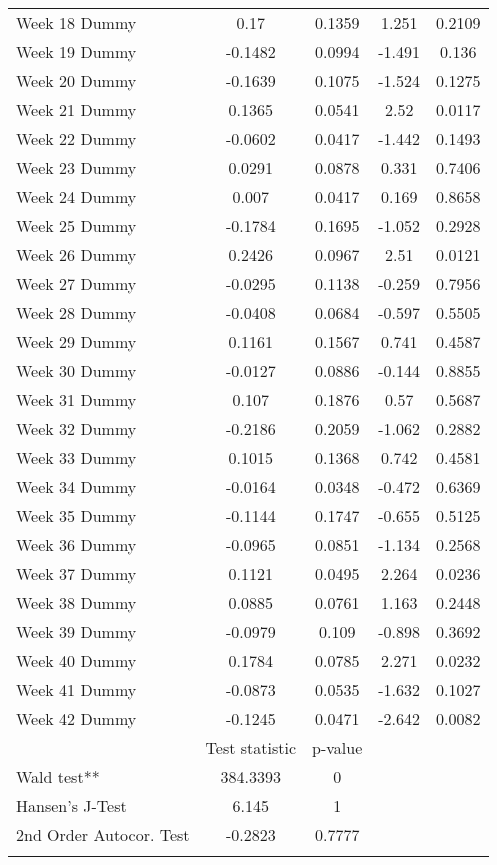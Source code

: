 \begin{longtable}{lcccc}
  Week 18 Dummy & 0.17 & 0.1359 & 1.251 & 0.2109 \\ 
  Week 19 Dummy & -0.1482 & 0.0994 & -1.491 & 0.136 \\ 
  Week 20 Dummy & -0.1639 & 0.1075 & -1.524 & 0.1275 \\ 
  Week 21 Dummy & 0.1365 & 0.0541 & 2.52 & 0.0117 \\ 
  Week 22 Dummy & -0.0602 & 0.0417 & -1.442 & 0.1493 \\ 
  Week 23 Dummy & 0.0291 & 0.0878 & 0.331 & 0.7406 \\ 
  Week 24 Dummy & 0.007 & 0.0417 & 0.169 & 0.8658 \\ 
  Week 25 Dummy & -0.1784 & 0.1695 & -1.052 & 0.2928 \\ 
  Week 26 Dummy & 0.2426 & 0.0967 & 2.51 & 0.0121 \\ 
  Week 27 Dummy & -0.0295 & 0.1138 & -0.259 & 0.7956 \\ 
  Week 28 Dummy & -0.0408 & 0.0684 & -0.597 & 0.5505 \\ 
  Week 29 Dummy & 0.1161 & 0.1567 & 0.741 & 0.4587 \\ 
  Week 30 Dummy & -0.0127 & 0.0886 & -0.144 & 0.8855 \\ 
  Week 31 Dummy & 0.107 & 0.1876 & 0.57 & 0.5687 \\ 
  Week 32 Dummy & -0.2186 & 0.2059 & -1.062 & 0.2882 \\ 
  Week 33 Dummy & 0.1015 & 0.1368 & 0.742 & 0.4581 \\ 
  Week 34 Dummy & -0.0164 & 0.0348 & -0.472 & 0.6369 \\ 
  Week 35 Dummy & -0.1144 & 0.1747 & -0.655 & 0.5125 \\ 
  Week 36 Dummy & -0.0965 & 0.0851 & -1.134 & 0.2568 \\ 
  Week 37 Dummy & 0.1121 & 0.0495 & 2.264 & 0.0236 \\ 
  Week 38 Dummy & 0.0885 & 0.0761 & 1.163 & 0.2448 \\ 
  Week 39 Dummy & -0.0979 & 0.109 & -0.898 & 0.3692 \\ 
  Week 40 Dummy & 0.1784 & 0.0785 & 2.271 & 0.0232 \\ 
  Week 41 Dummy & -0.0873 & 0.0535 & -1.632 & 0.1027 \\ 
  Week 42 Dummy & -0.1245 & 0.0471 & -2.642 & 0.0082 \\ 
   & Test statistic & p-value &  &  \\ 
  Wald test** & 384.3393 & 0 &  &  \\ 
  Hansen's J-Test & 6.145 & 1 &  &  \\ 
  2nd Order Autocor. Test & -0.2823 & 0.7777 &  &  \\ 
   \bottomrule
\caption{Results of two-step GMM estimation of policy, behavior and information on %
\label{tab_results:cases_spec_1_full}
\end{longtable}
\endgroup
